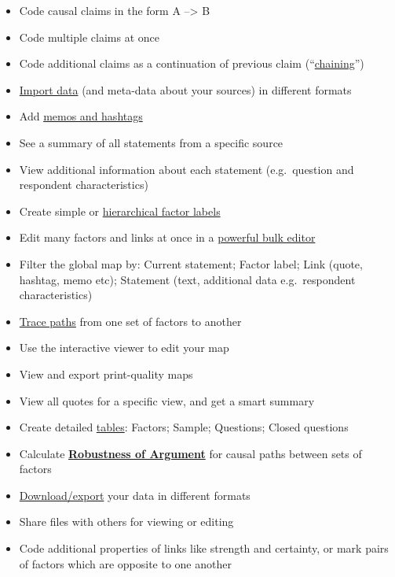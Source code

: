 \documentclass[
]{book}
\providecommand{\tightlist}{%
  \setlength{\itemsep}{0pt}\setlength{\parskip}{0pt}}
\begin{document}
\begin{itemize}
\tightlist
\item
  Code causal claims in the form A --\textgreater{} B
\item
  Code multiple claims at once
\item
  Code additional claims as a continuation of previous claim (``\protect\hyperlink{xchaining-links}{chaining}'')
\item
  \protect\hyperlink{ximport}{Import data} (and meta-data about your sources) in different formats
\item
  Add \protect\hyperlink{xmemosandhashtags}{memos and hashtags}
\item
  See a summary of all statements from a specific source
\item
  View additional information about each statement (e.g.~question and respondent characteristics)
\item
  Create simple or \protect\hyperlink{xhierarchical-coding}{hierarchical factor labels}
\item
  Edit many factors and links at once in a \protect\hyperlink{factor-editor}{powerful bulk editor}
\item
  Filter the global map by: Current statement; Factor label; Link (quote, hashtag, memo etc); Statement (text, additional data e.g.~respondent characteristics)
\item
  \protect\hyperlink{xrobustness}{Trace paths} from one set of factors to another
\item
  Use the interactive viewer to edit your map
\item
  View and export print-quality maps
\item
  View all quotes for a specific view, and get a smart summary
\item
  Create detailed \protect\hyperlink{core-tables}{tables}: Factors; Sample; Questions; Closed questions
\item
  Calculate \protect\hyperlink{xrobustness}{\textbf{Robustness of Argument}} for causal paths between sets of factors
\item
  \protect\hyperlink{xroundtripping}{Download/export} your data in different formats
\item
  Share files with others for viewing or editing
\item
  Code additional properties of links like strength and certainty, or mark pairs of factors which are opposite to one another
\end{itemize}
\end{document}
